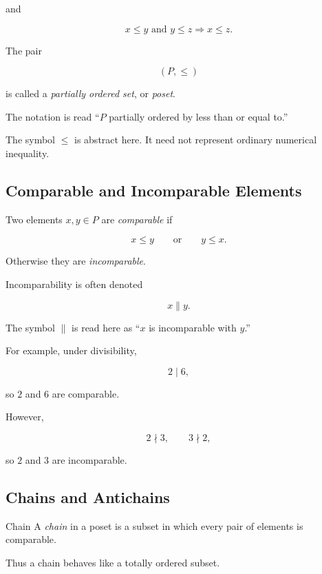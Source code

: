and

\[ x\leq y\text{ and }y\leq z\Longrightarrow x\leq z. \]

The pair

\[ (P,\leq) \]

is called a \emph{partially ordered set}, or \emph{poset}.

The notation is read ``\(P\) partially ordered by less than or equal to.''

The symbol \(\leq\) is abstract here. It need not represent ordinary
numerical inequality.

\subsection{Comparable and Incomparable Elements}
\label{subsec:comparable-incomparable}

Two elements \(x,y\in P\) are \emph{comparable} if

\[ x\leq y\qquad\text{or}\qquad y\leq x. \]

Otherwise they are \emph{incomparable}.

Incomparability is often denoted

\[ x\parallel y. \]

The symbol \(\parallel\) is read here as ``\(x\) is incomparable with
\(y\).''

For example, under divisibility,

\[ 2\mid6, \]

so \(2\) and \(6\) are comparable.

However,

\[ 2\nmid3,\qquad3\nmid2, \]

so \(2\) and \(3\) are incomparable.

\subsection{Chains and Antichains}
\label{subsec:chains-antichains}

\begin{definitionbox}{Chain}
A \emph{chain} in a poset is a subset in which every pair of elements is
comparable.
\end{definitionbox}

Thus a chain behaves like a totally ordered subset.

